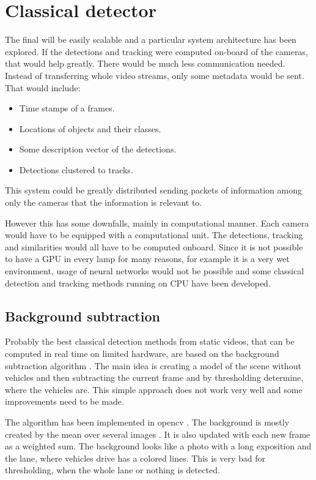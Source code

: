 \documentclass[a4paper,12pt,titlepage, twoside]{article}
\numberwithin{figure}{section}
\begin{document}
\section{Classical detector}

The final will be easily scalable and a particular system architecture has been explored. If the detections and tracking were computed on-board of the cameras, that would help greatly. There would be much less communication needed. Instead of transferring whole video streams, only some metadata would be sent. That would include: 

\begin{itemize}
\item Time stamps of a frames.
\item Locations of objects and their classes.
\item Some description vector of the detections.
\item Detections clustered to tracks.
\end{itemize}

This system could be greatly distributed sending packets of information among only the cameras that the information is relevant to.

However this has some downfalls, mainly in computational manner. Each camera would have to be equipped with a computational unit. The detections, tracking and similarities would all have to be computed onboard. Since it is not possible to have a GPU in every lamp for many reasons, for example it is a very wet environment, usage of neural networks would not be possible and some classical detection and tracking methods running on CPU have been developed.




\subsection{Background subtraction}
Probably the best classical detection methods from static videos, that can be computed in real time on limited hardware, are based on the background subtraction algorithm \cite{...}. The main idea is creating a model of the scene without vehicles and then subtracting the current frame and by thresholding determine, where the vehicles are. This simple approach does not work very well and some improvements need to be made. 

The algorithm has been implemented in opencv \cite{opencv}. The background is mostly created by the mean over several images \cite{bs1, bs2}. It is also updated with each new frame as a weighted sum. The background looks like a photo with a long exposition and the lane, where vehicles drive has a colored lines. This is very bad for thresholding, when the whole lane or nothing is detected. 
\end{document}
